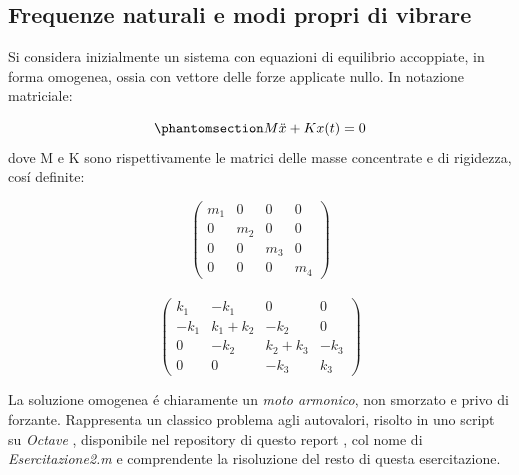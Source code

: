 \documentclass{article}
\begin{document}
        \subsection{Frequenze naturali e modi propri di vibrare\label{Esercitazione_2_modi}}

        Si considera inizialmente un sistema con equazioni di equilibrio accoppiate, in forma omogenea, ossia con vettore
        delle forze applicate nullo. In notazione matriciale: 

            \begin{equation}
                \phantomsection \label{equation:sist_omogeneo}
                M\ddot{x} + Kx(t) = 0
            \end{equation}
        dove M e K sono rispettivamente le matrici delle masse concentrate e di rigidezza, cosí definite:
        \begin{center}  
            \[
            \begin{pmatrix}
                m_1    & 0    & 0     & 0 \\ 
                0      & m_2  & 0     & 0 \\
                0      & 0    & m_3   & 0 \\
                0      & 0    & 0     & m_4 
                
            \end{pmatrix}
            \]
            \\ 
            \[
            \begin{pmatrix}
                k_1    & -k_1       & 0                     & 0 \\ 
                -k_1   & k_1 + k_2  & -k_2                  & 0 \\
                0      & -k_2       & k_2 + k_3             & -k_3 \\
                0      & 0          & -k_3                  & k_3 
                
            \end{pmatrix}
            \]
            
        \end{center}    
    
        La soluzione omogenea é chiaramente un \textit{moto armonico}, non smorzato e privo di forzante.
        Rappresenta un classico problema agli autovalori, risolto in uno script su \textit{Octave} \autocite{Octave}, disponibile 
        nel repository di questo report \autocite{Esercitazioni_strutture}, col nome di \textit{Esercitazione2.m} e comprendente
        la risoluzione del resto di questa esercitazione.
\end{document}
